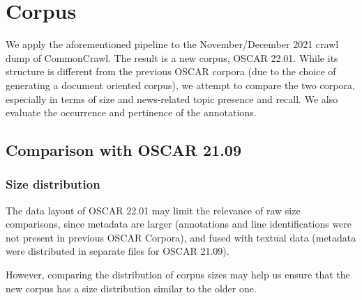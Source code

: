 




\section{Corpus}

We apply the aforementioned pipeline to the November/December 2021 crawl dump of CommonCrawl. The result is a new corpus, OSCAR 22.01. While its structure is different from the previous OSCAR corpora (due to the choice of generating a document oriented corpus), we attempt to compare the two corpora, especially in terms of size and news-related topic presence and recall. We also evaluate the occurrence and pertinence of the annotations.

\subsection{Comparison with OSCAR 21.09}
\subsubsection{Size distribution}

The data layout of OSCAR 22.01 may limit the relevance of raw size comparisons, since metadata are larger (annotations and line identifications were not present in previous OSCAR Corpora), and fused with textual data (metadata were distributed in separate files for OSCAR 21.09).

However, comparing the distribution of corpus sizes may help us ensure that the new corpus has a size distribution similar to the older one.

